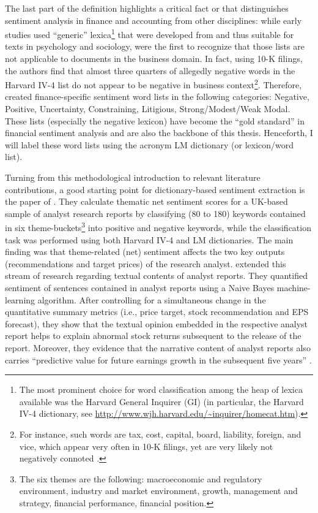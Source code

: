 The last part of the definition highlights a critical fact or that distinguishes sentiment analysis in finance and accounting from other disciplines: while early studies used \enquote{generic} lexica\footnote{The most prominent choice for word classification among the heap of lexica available was the Harvard General Inquirer (GI) (in particular, the Harvard IV-4 dictionary, see \url{http://www.wjh.harvard.edu/~inquirer/homecat.htm}).} that were developed from and thus suitable for texts in psychology and sociology, \textcite{Loughran2011} were the first to recognize that those lists are not applicable to documents in the business domain. In fact, using 10-K filings, the authors find that almost three quarters of allegedly negative words in the Harvard IV-4 list do not appear to be negative in business context\footnote{For instance, such words are \textsf{tax, cost, capital, board, liability, foreign}, and \textsf{vice}, which appear very often in 10-K filings, yet are very likely not negatively connoted \parencite[36]{Loughran2011}.}. Therefore, \textcite{Loughran2011} created finance-specific sentiment word lists in the following categories: Negative, Positive, Uncertainty, Constraining, Litigious, Strong/Modest/Weak Modal. These lists (especially the negative lexicon) have become the \enquote{gold standard} in financial sentiment analysis and are also the backbone of this thesis. Henceforth, I will label these word lists using the acronym LM dictionary (or lexicon/word list). 


Turning from this methodological introduction to relevant literature contributions, a good starting point for dictionary-based sentiment extraction is the paper of \textcite{YukselturkTucker2015}. They calculate thematic net sentiment scores for a UK-based sample of analyst research reports by classifying (80 to 180) keywords contained in six theme-buckets\footnote{The six themes are the following: macroeconomic and regulatory environment, industry and market environment, growth, management and strategy, financial performance, financial position.} into positive and negative keywords, while the classification task was performed using both Harvard IV-4 and LM dictionaries. The main finding was that theme-related (net) sentiment affects the two key outputs (recommendations and target prices) of the research analyst. \textcite{HuangZangZheng14} extended this stream of research regarding textual contents of analyst reports. They quantified sentiment of sentences contained in analyst reports using a Naive Bayes machine-learning algorithm. After controlling for a simultaneous change in the quantitative summary metrics (i.e., price target, stock recommendation and EPS forecast), they show that the textual opinion embedded in the respective analyst report helps to explain abnormal stock returns subsequent to the release of the report. Moreover, they evidence that the narrative content of analyst reports also carries \enquote {predictive value for future earnings growth in the subsequent five years} \parencite[2151]{HuangZangZheng14}. 

